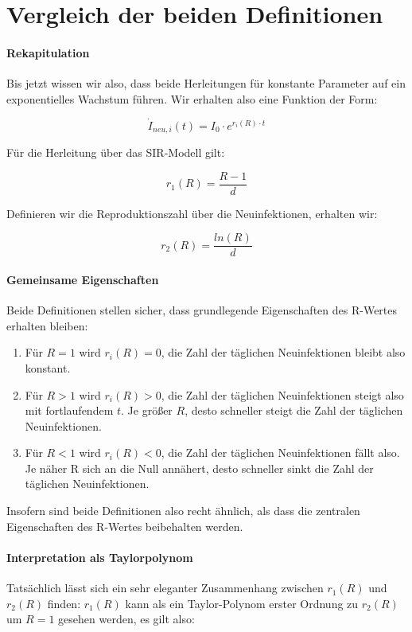 \documentclass[a4paper]{article}
\begin{document}
    \section{Vergleich der beiden Definitionen}
    \paragraph{Rekapitulation}Bis jetzt wissen wir also, dass beide Herleitungen für konstante Parameter auf ein exponentielles Wachstum führen. Wir erhalten also eine Funktion der Form:
    
    $$ \dot{I}_{neu,i}(t) = I_0 \cdot e^{r_{i}(R) \cdot t} $$

    Für die Herleitung über das SIR-Modell gilt: 

    $$ r_{1}(R) = \frac{R-1}{d} $$

    Definieren wir die Reproduktionszahl über die Neuinfektionen, erhalten wir: 

    $$ r_{2}(R) = \frac{ln(R)}{d} $$

    \paragraph{Gemeinsame Eigenschaften}Beide Definitionen stellen sicher, dass grundlegende Eigenschaften des R-Wertes erhalten bleiben: 

    \begin{enumerate}
        \item Für $R=1$ wird $r_{i}(R)=0$, die Zahl der täglichen Neuinfektionen bleibt also konstant. 
        \item Für $R>1$ wird $r_{i}(R)>0$, die Zahl der täglichen Neuinfektionen steigt also mit fortlaufendem $t$. Je größer $R$, desto schneller steigt die Zahl der täglichen Neuinfektionen.
        \item Für $R<1$ wird $r_{i}(R)<0$, die Zahl der täglichen Neuinfektionen fällt also. Je näher R sich an die Null annähert, desto schneller sinkt die Zahl der täglichen Neuinfektionen.
    \end{enumerate}

    Insofern sind beide Definitionen also recht ähnlich, als dass die zentralen Eigenschaften des R-Wertes beibehalten werden. 

    \paragraph{Interpretation als Taylorpolynom}Tatsächlich lässt sich ein sehr eleganter Zusammenhang zwischen $r_{1}(R)$ und $r_{2}(R)$ finden: $r_{1}(R)$ kann als ein Taylor-Polynom erster Ordnung zu $r_{2}(R)$ um $R=1$ gesehen werden, es gilt also:
    
\end{document}
